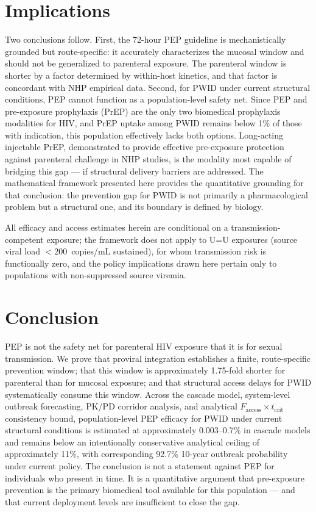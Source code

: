 \documentclass[10pt,letterpaper]{article}
\theoremstyle{definition}
\theoremstyle{remark}
\newcommand{\Faccess}{F_{\text{access}}}
\newcommand{\tcrit}{t_{\text{crit}}}
\begin{document}
\section*{Implications}

Two conclusions follow. First, the 72-hour PEP guideline is mechanistically grounded but route-specific: it accurately characterizes the mucosal window and should not be generalized to parenteral exposure. The parenteral window is shorter by a factor determined by within-host kinetics, and that factor is concordant with NHP empirical data. Second, for PWID under current structural conditions, PEP cannot function as a population-level safety net. Since PEP and pre-exposure prophylaxis (PrEP) are the only two biomedical prophylaxis modalities for HIV\cite{grant2010,anderson2012}, and PrEP uptake among PWID remains below 1\% of those with indication\cite{baugher2025}, this population effectively lacks both options. Long-acting injectable PrEP, demonstrated to provide effective pre-exposure protection against parenteral challenge in NHP studies\cite{swanstrom2023,vidal2022}, is the modality most capable of bridging this gap --- if structural delivery barriers are addressed\cite{demidont2026}. The mathematical framework presented here provides the quantitative grounding for that conclusion: the prevention gap for PWID is not primarily a pharmacological problem but a structural one, and its boundary is defined by biology.

All efficacy and access estimates herein are conditional on a transmission-competent exposure; the framework does not apply to U=U exposures (source viral load $<200$~copies/mL sustained), for whom transmission risk is functionally zero, and the policy implications drawn here pertain only to populations with non-suppressed source viremia.

\section*{Conclusion}

PEP is not the safety net for parenteral HIV exposure that it is for sexual transmission. We prove that proviral integration establishes a finite, route-specific prevention window; that this window is approximately 1.75-fold shorter for parenteral than for mucosal exposure; and that structural access delays for PWID systematically consume this window. Across the cascade model, system-level outbreak forecasting, PK/PD corridor analysis, and analytical $\Faccess \times \tcrit$ consistency bound, population-level PEP efficacy for PWID under current structural conditions is estimated at approximately 0.003--0.7\% in cascade models and remains below an intentionally conservative analytical ceiling of approximately 11\%, with corresponding 92.7\% 10-year outbreak probability under current policy. The conclusion is not a statement against PEP for individuals who present in time. It is a quantitative argument that pre-exposure prevention is the primary biomedical tool available for this population --- and that current deployment levels are insufficient to close the gap.
\end{document}
